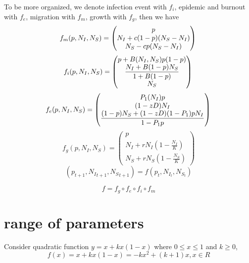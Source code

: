 \documentclass[12pt]{article}
\begin{document}
To be more organized, we denote infection event with $f_i$, epidemic and burnout with $f_e$, migration with $f_m$, growth with $f_g$, then we have
$$
    f_m(p,N_I,N_S) =
    \begin{pmatrix}
        p \\
         N_I + c(1 - p)(N_S - N_I)\\
        N_S - cp(N_S - N_I) 
    \end{pmatrix} \\
$$
$$
    f_i(p,N_I,N_S) = 
    \begin{pmatrix}
        p + B(N_I,N_S)p(1 - p) \\
        \dfrac{N_I + B(1 - p)N_S}{1 + B(1 - p)}\\
        N_S 
    \end{pmatrix} \\
$$
$$
    f_e(p,N_I,N_S) =
    \begin{pmatrix}
        P_1(N_I)p \\
        (1 - zD)N_I \\
        \dfrac{(1 - p)N_S + (1 - zD)(1 - P_1)pN_I}{1 - P_1p}
    \end{pmatrix} \\
$$
$$
    f_g(p,N_I,N_S) =
    \begin{pmatrix}
        p \\
        N_I + rN_I\left(1 - \frac{N_I}{K} \right) \\
        N_S + rN_S\left(1 - \frac{N_S}{K} \right)
    \end{pmatrix}
$$
$$(p_{t+1},{N_I}_{t+1},{N_S}_{t+1})=f(p_t,N_{I_t},N_{S_t})$$

$$f=f_g  \circ f_e \circ f_i \circ f_m$$

\section{range of parameters}
Consider quadratic function $y=x+kx(1-x)$ where $0\leq x\leq 1$ and $k\geq 0$,
$$f(x)=x+kx(1-x)=-kx^2+(k+1)x, x \in R $$
\end{document}
